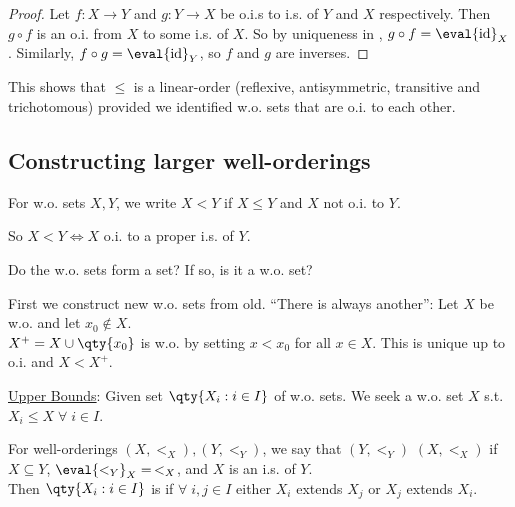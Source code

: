 \begin{proof}
    Let $f \colon X \to Y$ and $g \colon Y \to X$ be o.i.s to i.s. of $Y$ and $X$ respectively.
    Then $g \circ f$ is an o.i. from $X$ to some i.s. of $X$.
    So by uniqueness in , $g \circ f = \eval{\operatorname{id}}_X$.
    Similarly, $f \circ g = \eval{\operatorname{id}}_Y$, so $f$ and $g$ are inverses.
\end{proof}

\begin{remark}
    This shows that $\leq$ is a linear-order (reflexive, antisymmetric, transitive and trichotomous) provided we identified w.o. sets that are o.i. to each other. \\
\end{remark}

\subsection{Constructing larger well-orderings}

\begin{definition}
    For w.o. sets $X, Y$, we write $X < Y$ if $X \leq Y$ and $X$ not o.i. to $Y$.
\end{definition}
So $X < Y \iff X$ o.i. to a proper i.s. of $Y$.

\begin{question}
    Do the w.o. sets form a set? If so, is it a w.o. set?
\end{question}

\begin{answer}
    First we construct new w.o. sets from old.
    ``There is always another'': Let $X$ be w.o. and let $x_0 \not\in X$. \\
    $X^+ = X \cup \qty{x_0}$ is w.o. by setting $x < x_0$ for all $x \in X$.
    This is unique up to o.i. and $X < X^+$.
\end{answer}

\underline{Upper Bounds}: Given set $\qty{X_i : i \in I}$ of w.o. sets.
We seek a w.o. set $X$ s.t. $X_i \leq X \; \forall \; i \in I$.

\begin{definition}[Extends]
    For well-orderings $(X, <_X), (Y, <_Y)$, we say that $(Y, <_Y)$  $(X, <_X)$ if $X \subseteq Y$, $\eval{<_Y}_{X} =\, <_X$, and $X$ is an i.s. of $Y$. \\
    Then $\qty{X_i : i \in I}$ is  if $\forall \; i, j \in I$ either $X_i$ extends $X_j$ or $X_j$ extends $X_i$.
\end{definition}

